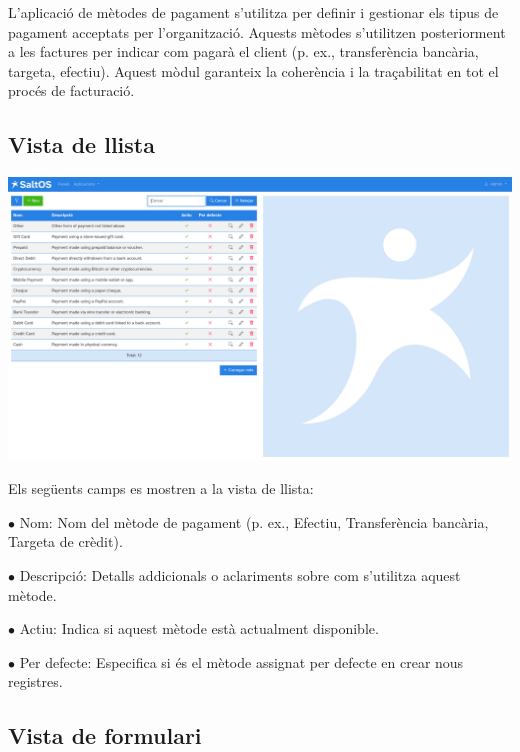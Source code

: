\documentclass[a4paper]{article}
\begin{document}
L'aplicació de mètodes de pagament s'utilitza per definir i gestionar els tipus de pagament acceptats per l'organització.
Aquests mètodes s'utilitzen posteriorment a les factures per indicar com pagarà el client (p. ex., transferència bancària, targeta, efectiu).
Aquest mòdul garanteix la coherència i la traçabilitat en tot el procés de facturació.

\hypertarget{toc148}{}
\subsection{Vista de llista}

\begin{center}\includegraphics[width=1\textwidth]{../ujest/snaps/test-screenshots-js-screenshots-sales-payment-methods-list-ca-es-1-snap.png}\end{center}

Els següents camps es mostren a la vista de llista:

\begin{compactitem}
\item[\color{myblue}$\bullet$] Nom: Nom del mètode de pagament (p. ex., Efectiu, Transferència bancària, Targeta de crèdit).
\item[\color{myblue}$\bullet$] Descripció: Detalls addicionals o aclariments sobre com s'utilitza aquest mètode.
\item[\color{myblue}$\bullet$] Actiu: Indica si aquest mètode està actualment disponible.
\item[\color{myblue}$\bullet$] Per defecte: Especifica si és el mètode assignat per defecte en crear nous registres.
\end{compactitem}

\hypertarget{toc149}{}
\subsection{Vista de formulari}
\end{document}
